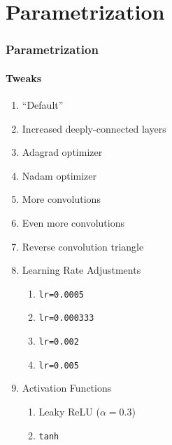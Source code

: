 \newcommand{\secttitle}{Parametrization}
\section{\secttitle}

\begin{frame}
	\frametitle{\secttitle}
	\framesubtitle{Tweaks}
	\begin{enumerate}
		\item ``Default''
		\item Increased deeply-connected layers
		\item Adagrad optimizer
		\item Nadam optimizer
		\item More convolutions
		\item Even more convolutions
		\item Reverse convolution triangle
		\item Learning Rate Adjustments
			\begin{enumerate}
				\item \texttt{lr=0.0005}
				\item \texttt{lr=0.000333}
				\item \texttt{lr=0.002}
				\item \texttt{lr=0.005}
			\end{enumerate}
		\item Activation Functions
			\begin{enumerate}
				\item Leaky ReLU ($\alpha = 0.3$)
				\item \texttt{tanh}
			\end{enumerate}
	\end{enumerate}
\end{frame}

